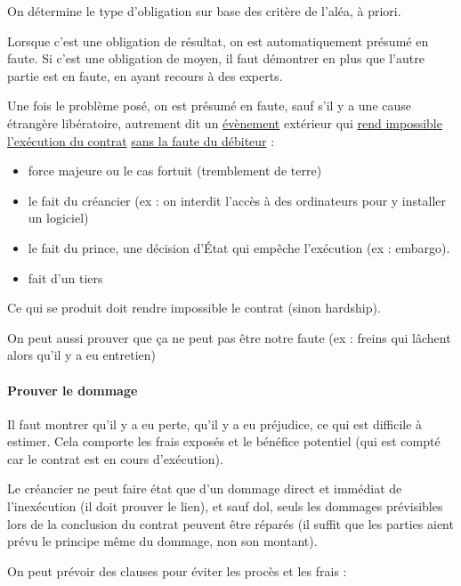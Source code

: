 			On détermine le type d'obligation sur base des critère de l'aléa, à priori. 
			
			Lorsque c'est une obligation de résultat, on est automatiquement présumé en faute. Si c'est une obligation de moyen, il faut démontrer en plus que l'autre partie est en faute, en ayant recours à des experts.
			
			Une fois le problème posé, on est présumé en faute, sauf s'il y a une cause étrangère libératoire, autrement dit un \underline{évènement} extérieur qui \underline{rend impossible l'exécution du contrat} \underline{sans la faute du débiteur} :
			
			\begin{itemize}
				\item force majeure ou le cas fortuit (tremblement de terre)
				\item le fait du créancier (ex : on interdit l'accès à des ordinateurs pour y installer un logiciel)
				\item le fait du prince, une décision d'État qui empêche l'exécution (ex : embargo).
				\item fait d'un tiers
			\end{itemize}
			
			Ce qui se produit doit rendre impossible le contrat (sinon hardship).
			
			On peut aussi prouver que ça ne peut pas être notre faute (ex : freins qui lâchent alors qu'il y a eu entretien)
			
			\paragraph{Prouver le dommage}
			
			Il faut montrer qu'il y a eu perte, qu'il y a eu préjudice, ce qui est difficile à estimer. Cela comporte les frais exposés et le bénéfice potentiel (qui est compté car le contrat est en cours d'exécution).
			
			Le créancier ne peut faire état que d'un dommage direct et immédiat de l'inexécution (il doit prouver le lien), et sauf dol, seuls les dommages prévisibles lors de la conclusion du contrat peuvent être réparés (il suffit que les parties aient prévu le principe même du dommage, non son montant).
			
			On peut prévoir des clauses pour éviter les procès et les frais :
			
